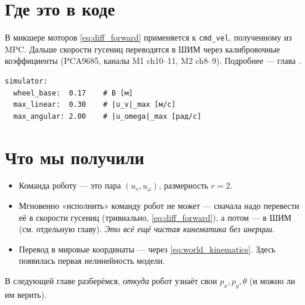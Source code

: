 \section{Где это в коде}

\begin{codebox}[title={\filepath{pi\_nodes/nodes/motor\_node.py}}]
В микшере моторов \eqref{eq:diff_forward} применяется к \texttt{cmd\_vel},
полученному из MPC. Дальше скорости гусениц переводятся в ШИМ через
калибровочные коэффициенты (PCA9685, каналы M1 ch10--11, M2 ch8--9).
Подробнее --- глава .
\end{codebox}

\begin{codebox}[title={\filepath{config.yaml}, секция \texttt{simulator:}}]
\begin{verbatim}
simulator:
  wheel_base:  0.17    # B [м]
  max_linear:  0.30    # |u_v|_max [м/с]
  max_angular: 2.00    # |u_omega|_max [рад/с]
\end{verbatim}
\end{codebox}

\section{Что мы получили}

\begin{itemize}
  \item Команда роботу --- это пара $(u_v, u_\omega)$, размерность $r = 2$.
  \item Мгновенно «исполнить» команду робот не может --- сначала надо
        перевести её в скорости гусениц (тривиально, \eqref{eq:diff_forward}),
        а потом --- в ШИМ (см. отдельную главу). \emph{Это всё ещё чистая
        кинематика без инерции}.
  \item Перевод в мировые координаты --- через \eqref{eq:world_kinematics}.
        Здесь появилась первая нелинейность модели.
\end{itemize}

В следующей главе разберёмся, \emph{откуда} робот узнаёт свои $p_x, p_y, \theta$
(и можно ли им верить).
